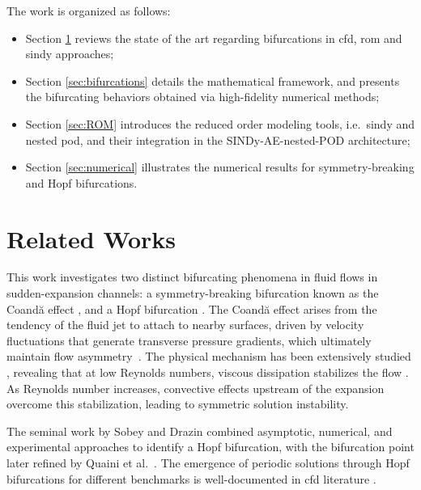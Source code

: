 \documentclass[reqno]{amsart}[standalone]
\theoremstyle{definition}
\theoremstyle{remark}
\begin{document}
The work is organized as follows:
\begin{itemize}
    \item Section \ref{sec:related} reviews the state of the art regarding bifurcations in \gls{cfd}, \gls{rom} and \gls{sindy} approaches;
    \item Section \ref{sec:bifurcations} details the mathematical framework, and presents the bifurcating behaviors obtained via high-fidelity numerical methods;
    \item Section \ref{sec:ROM} introduces the reduced order modeling tools, i.e.\ \gls{sindy} and nested \gls{pod}, and their integration in the SINDy-AE-nested-POD architecture;
    \item Section \ref{sec:numerical} illustrates the numerical results for symmetry-breaking and Hopf bifurcations.
\end{itemize}





\section{Related Works}\label{sec:related}

This work investigates two distinct bifurcating phenomena in fluid flows in sudden-expansion channels: a symmetry-breaking bifurcation known as the Coandă effect \parencite{PichiDrivingBifurcatingParametrized2022a,Khamlich_2022,Pitton_2017}, and a Hopf bifurcation \parencite{QUAINI,Fortin_localization}. %
%
%
The Coandă effect arises from the tendency of the fluid jet to attach to nearby surfaces, driven by velocity fluctuations that generate transverse pressure gradients, which ultimately maintain flow asymmetry~\parencite{tritton1977physical, wille1965coanda}. The physical mechanism has been extensively studied \parencite{Cherdron_Durst_Whitelaw_1978, Sobey_Drazin_1986}, revealing that at low Reynolds numbers, viscous dissipation stabilizes the flow \parencite{HAWA_RUSAK_2001}. As Reynolds number increases, convective effects upstream of the expansion overcome this stabilization, leading to symmetric solution instability.

The seminal work by Sobey and Drazin \parencite{Sobey_Drazin_1986} combined asymptotic, numerical, and experimental approaches to identify a Hopf bifurcation, with the bifurcation point later refined by Quaini et al.\ \parencite{QUAINI}. The emergence of periodic solutions through Hopf bifurcations for different benchmarks is well-documented in \gls{cfd} literature \parencite{Sobey_Drazin_1986, Fortin_localization, ArioliKoch2021, Dušek_Gal_Fraunié_1994}.
\end{document}
